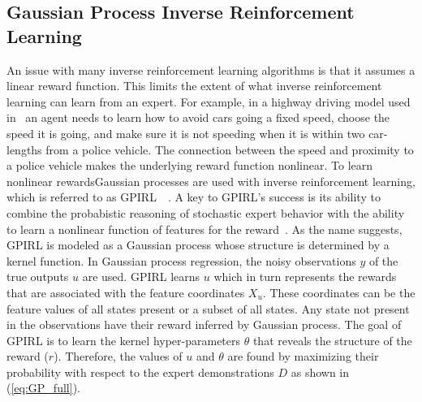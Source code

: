 \documentclass[12pt,american]{report}
\providecommand{\DIFaddtex}[1]{{\protect\color{blue}\uwave{#1}}} %
\providecommand{\DIFaddbegin}{} %
\providecommand{\DIFaddend}{} %
\providecommand{\DIFadd}[1]{\texorpdfstring{\DIFaddtex{#1}}{#1}} %
\newcommand{\DIFaddincludegraphics}[2][]{{\color{blue}\fbox{\DIFOincludegraphics[#1]{#2}}}} %
\DeclareRobustCommand{\DIFaddbegin}{\DIFOaddbegin \let\includegraphics\DIFaddincludegraphics} %
\DeclareRobustCommand{\DIFaddend}{\DIFOaddend \let\includegraphics\DIFOincludegraphics} %
\begin{document}
\subsection{Gaussian Process Inverse Reinforcement Learning \DIFaddbegin \DIFadd{(GPIRL)}\DIFaddend }
\label{sec:gpirl}
An issue with many inverse reinforcement learning algorithms is that it assumes a linear reward function.  This limits the extent of what inverse reinforcement learning can learn from an expert.  For example, in a highway driving model used in~\cite{levine2011nonlinear} an agent needs to learn how to avoid cars going a fixed speed, choose the speed it is going, and make sure it is not speeding when it is within two car-lengths from a police vehicle.  The connection between the speed and proximity to a police vehicle makes the underlying reward function nonlinear. To learn nonlinear rewards\DIFaddbegin \DIFadd{, }\DIFaddend Gaussian processes are used with inverse reinforcement learning, which is referred to as GPIRL~\cite{qiao2011inverse}~\cite{levine2011nonlinear}. A key to GPIRL's success is its ability to combine the probabistic reasoning of stochastic expert behavior with the ability to learn a nonlinear function of features for the reward~\cite{levine2011nonlinear}. As the name suggests, GPIRL is modeled as a Gaussian process whose structure is determined by a kernel function. In Gaussian process regression, the noisy observations $y$ of the true outputs $u$ are used.  GPIRL learns $u$ which in turn represents the rewards that are associated with the feature coordinates $X_u$. These coordinates can be the feature values of all states present or a subset of all states. Any state not present in the observations have their reward inferred by Gaussian process.  The goal of GPIRL is to learn the kernel hyper-parameters $\theta$ that reveals the structure of the reward ($r$). Therefore, the values of $u$ and $\theta$ are found by maximizing their probability with respect to the expert demonstrations $D$ as shown in (\ref{eq:GP_full})\DIFaddbegin \DIFadd{~\mbox{%
\cite{levine2011nonlinear}}%
}\DIFaddend .
\end{document}
